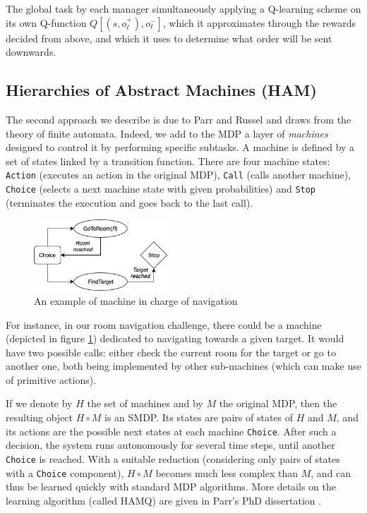 \documentclass{article}
\begin{document}
The global task by each manager simultaneously applying a Q-learning scheme on its own Q-function $Q[(s, o_{\ell}^+), o_{\ell}^-]$, which it approximates through the rewards decided from above, and which it uses to determine what order will be sent downwards.

\subsection{Hierarchies of Abstract Machines (HAM)}

The second approach we describe is due to Parr and Russel \cite{parr_reinforcement_1998} and draws from the theory of finite automata. Indeed, we add to the MDP a layer of \emph{machines} designed to control it by performing specific subtasks. A machine is defined by a set of states linked by a transition function. There are four machine states: \texttt{Action} (executes an action in the original MDP), \texttt{Call} (calls another machine), \texttt{Choice} (selects a next machine state with given probabilities) and \texttt{Stop} (terminates the execution and goes back to the last call).

\begin{figure}
\includegraphics[width=5cm]{images/HAM.png}
\caption{An example of machine in charge of navigation}
\label{fig:HAM}
\end{figure}

For instance, in our room navigation challenge, there could be a machine (depicted in figure \ref{fig:HAM}) dedicated to navigating towards a given target. It would have two possible calls: either check the current room for the target or go to another one, both being implemented by other sub-machines (which can make use of primitive actions).

If we denote by $H$ the set of machines and by $M$ the original MDP, then the resulting object $H \circ M$ is an SMDP. Its states are pairs of states of $H$ and $M$, and its actions are the possible next states at each machine \texttt{Choice}. After such a decision, the system runs autonomously for several time steps, until another \texttt{Choice} is reached. With a suitable reduction (considering only pairs of states with a \texttt{Choice} component),  $H \circ M$ becomes much less complex than $M$, and can thus be learned quickly with standard MDP algorithms. More details on the learning algorithm (called HAMQ) are given in Parr's PhD dissertation \cite{parr_hierarchical_1998}. 
\end{document}
